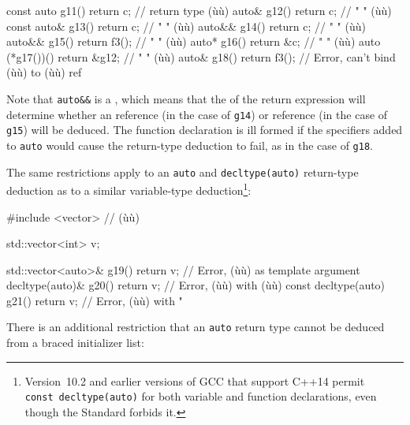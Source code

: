 \begin{emcppslisting}[emcppsbatch=e1]
const auto  g11() { return c; }     // return type (ù{}ù)
auto&       g12() { return c; }     //    "     "  (ù{}ù)
const auto& g13() { return c; }     //    "     "  (ù{}ù)
auto&&      g14() { return c; }     //    "     "  (ù{}ù)
auto&&      g15() { return f3(); }  //    "     "  (ù{}ù)
auto*       g16() { return &c; }    //    "     "  (ù{}ù)
auto   (*g17())() { return &g12; }  //    "     "  (ù{}ù)
auto&       g18() { return f3(); }  // Error, can't bind (ù{}ù) to (ù{}ù) ref
\end{emcppslisting}
    

\noindent Note that \lstinline!auto&&! is a , which
means that the  of the return expression will
determine whether an  reference (in the case of
\lstinline!g14!) or  reference (in the case of \lstinline!g15!)
will be deduced. The function declaration is ill formed if the
specifiers added to \lstinline!auto! would cause the return-type deduction
to fail, as in the case of \lstinline!g18!.

The same restrictions apply to an \lstinline!auto! and
\lstinline!decltype(auto)! return-type deduction as to a similar
variable-type deduction{\cprotect\footnote{Version~10.2 and earlier
versions of GCC that support C++14 permit
\lstinline!const!~\lstinline!decltype(auto)! for both variable and function
  declarations, even though the Standard forbids it.}}:

\begin{emcppslisting}
#include <vector>  // (ù{}ù)

std::vector<int> v;

std::vector<auto>&   g19() { return v; }  // Error, (ù{}ù) as template argument
decltype(auto)&      g20() { return v; }  // Error, (ù{\codeincomments{\&}}ù) with (ù{}ù)
const decltype(auto) g21() { return v; }  // Error, (ù{}ù) with   "
\end{emcppslisting}
    

\noindent There is an additional restriction that an \lstinline!auto! return type
cannot be deduced from a braced initializer list:


